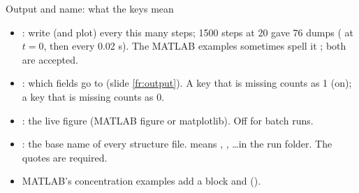 \documentclass[aspectratio=169,11pt]{beamer}
\begin{document}
\begin{frame}{Output and name: what the keys mean}
\label{fr:input3b}
\small
\begin{itemize}
  \item {}: write (and plot) every this many steps; 1500 steps at 20 gave 76 dumps ( at $t = 0$, then every 0.02 s). The MATLAB examples sometimes spell it ; both are accepted.
  \item {}: which fields go to  (slide \ref{fr:output}). A  key that is missing counts as 1 (on); a  key that is missing counts as 0.
  \item {}: the live figure (MATLAB figure or matplotlib). Off for batch runs.
  \item {}: the base name of every structure file.  means , , \ldots in the run folder. The quotes are required.
  \item MATLAB's concentration examples add a block  and  ().
\end{itemize}
\end{frame}
\end{document}
